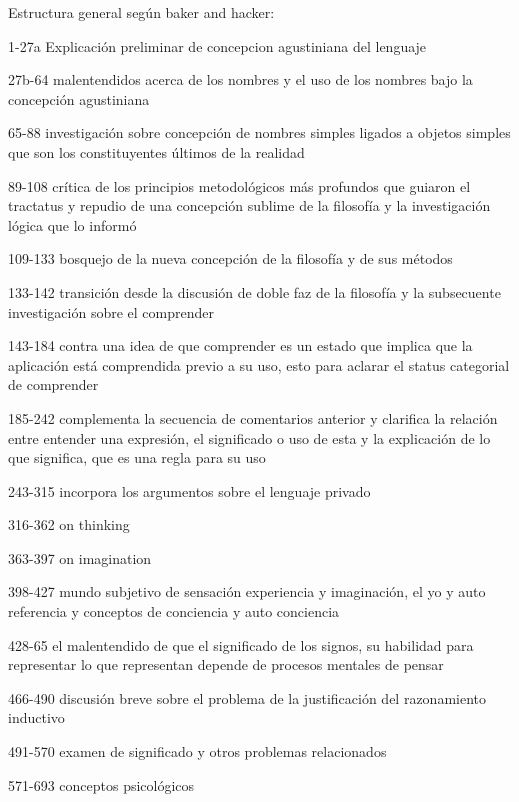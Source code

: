 Estructura general según baker and hacker:

1-27a Explicación preliminar de concepcion agustiniana del lenguaje

27b-64 malentendidos acerca de los nombres y el uso de los nombres bajo la
concepción agustiniana

65-88 investigación sobre concepción de nombres simples ligados a objetos
simples que son los constituyentes últimos de la realidad

89-108 crítica de los principios metodológicos más profundos que guiaron el
tractatus y repudio de una concepción sublime de la filosofía y la investigación
lógica que lo informó

109-133 bosquejo de la nueva concepción de la filosofía y de sus métodos

133-142 transición desde la discusión de doble faz de la filosofía y la
subsecuente investigación sobre el comprender

143-184 contra una idea de que comprender es un estado que implica que la
aplicación está comprendida previo a su uso, esto para aclarar el status
categorial de comprender

185-242 complementa la secuencia de comentarios anterior y clarifica la relación
entre entender una expresión, el significado o uso de esta y la explicación de
lo que significa, que es una regla para su uso

243-315
incorpora los argumentos sobre el lenguaje privado

316-362 on thinking

363-397 on imagination

398-427 mundo subjetivo de sensación experiencia y imaginación, el yo y auto
referencia y conceptos de conciencia y auto conciencia

428-65 el malentendido de que el significado de los signos, su habilidad para
representar lo que representan depende de procesos mentales de pensar

466-490 discusión breve sobre el problema de la justificación del razonamiento
inductivo

491-570 examen de significado y otros problemas relacionados

571-693 conceptos psicológicos
